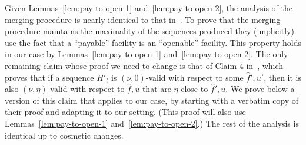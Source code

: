 Given Lemmas~\ref{lem:pay-to-open-1} and~\ref{lem:pay-to-open-2}, the analysis of the merging procedure is nearly identical to that in~\cite{MR4928455-Cohen25}.
To prove that the merging procedure maintains the maximality of the sequences produced they (implicitly) use the fact that a ``payable'' facility is an ``openable'' facility.
This property holds in our case by Lemmas~\ref{lem:pay-to-open-1} and~\ref{lem:pay-to-open-2}.
The only remaining claim whose proof we need to change is that of Claim $4$ in~\cite{MR4928455-Cohen25}, which proves that if a sequence $H'_t$ is $(\nu, 0)$-valid with respect to some $\hat f', u'$, then it is also $(\nu, \eta)$-valid with respect to $\hat f, u$ that are $\eta$-close to $\hat f', u$.
We prove below a version of this claim that applies to our case, by starting with a verbatim copy of their proof and adapting it to our setting.
(This proof will also use Lemmas~\ref{lem:pay-to-open-1} and~\ref{lem:pay-to-open-2}.)
The rest of the analysis is identical up to cosmetic changes.

